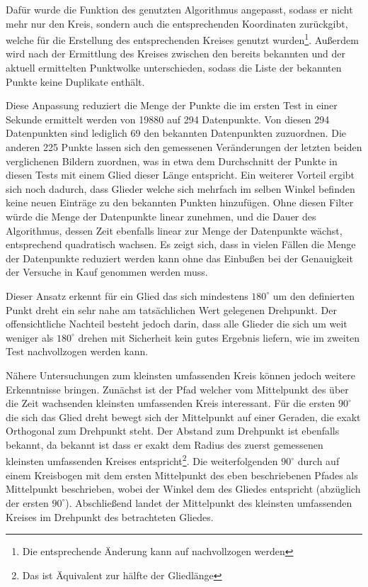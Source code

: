 Dafür wurde die Funktion des genutzten Algorithmus angepasst, sodass er nicht mehr nur den Kreis, sondern auch die entsprechenden Koordinaten zurückgibt, welche für die Erstellung des entsprechenden Kreises genutzt wurden\footnote{Die entsprechende Änderung kann auf  nachvollzogen werden}.
Au{\ss}erdem wird nach der Ermittlung des Kreises zwischen den bereits bekannten und der aktuell ermittelten Punktwolke unterschieden, sodass die Liste der bekannten Punkte keine Duplikate enthält.

Diese Anpassung reduziert die Menge der Punkte die im ersten Test in einer Sekunde ermittelt werden von 19880 auf 294 Datenpunkte.
Von diesen 294 Datenpunkten sind lediglich 69 den bekannten Datenpunkten zuzuordnen.
Die anderen 225 Punkte lassen sich den gemessenen Veränderungen der letzten beiden verglichenen Bildern zuordnen, was in etwa dem Durchschnitt der Punkte in diesen Tests mit einem Glied dieser Länge entspricht.
Ein weiterer Vorteil ergibt sich noch dadurch, dass Glieder welche sich mehrfach im selben Winkel befinden keine neuen Einträge zu den bekannten Punkten hinzufügen.
Ohne diesen Filter würde die Menge der Datenpunkte linear zunehmen, und die Dauer des Algorithmus, dessen Zeit ebenfalls linear zur Menge der Datenpunkte wächst, entsprechend quadratisch wachsen.
Es zeigt sich, dass in vielen Fällen die Menge der Datenpunkte reduziert werden kann ohne das Einbu{\ss}en bei der Genauigkeit der Versuche in Kauf genommen werden muss.

Dieser Ansatz erkennt für ein Glied das sich mindestens $180^\circ$ um den definierten Punkt dreht ein sehr nahe am tatsächlichen Wert gelegenen Drehpunkt.
Der offensichtliche Nachteil besteht jedoch darin, dass alle Glieder die sich um weit weniger als $180^\circ$ drehen mit Sicherheit kein gutes Ergebnis liefern, wie im zweiten Test nachvollzogen werden kann.

Nähere Untersuchungen zum kleinsten umfassenden Kreis können jedoch weitere Erkenntnisse bringen.
Zunächst ist der Pfad welcher vom Mittelpunkt des über die Zeit wachsenden kleinsten umfassenden Kreis interessant.
Für die ersten $90^\circ$ die sich das Glied dreht bewegt sich der Mittelpunkt auf einer Geraden, die exakt Orthogonal zum Drehpunkt steht.
Der Abstand zum Drehpunkt ist ebenfalls bekannt, da bekannt ist dass er exakt dem Radius des zuerst gemessenen kleinsten umfassenden Kreises entspricht\footnote{Das ist Äquivalent zur hälfte der Gliedlänge}.
Die weiterfolgenden $90^\circ$ durch auf einem Kreisbogen mit dem ersten Mittelpunkt des eben beschriebenen Pfades als Mittelpunkt beschrieben, wobei der Winkel dem des Gliedes entspricht (abzüglich der ersten $90^\circ$).
Abschlie{\ss}end landet der Mittelpunkt des kleinsten umfassenden Kreises im Drehpunkt des betrachteten Gliedes.

